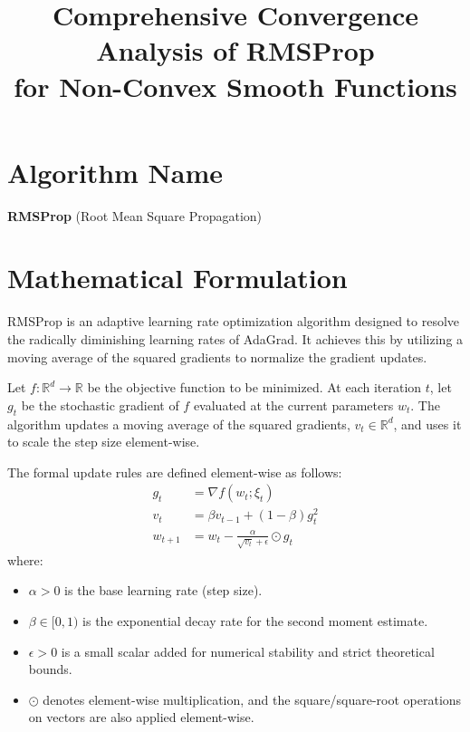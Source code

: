 \documentclass[11pt]{article}
\title{Comprehensive Convergence Analysis of RMSProp \\ for Non-Convex Smooth Functions}
\author{}
\date{}
\begin{document}
\maketitle

\section*{Algorithm Name}
\textbf{RMSProp} (Root Mean Square Propagation)

\section*{Mathematical Formulation}
RMSProp is an adaptive learning rate optimization algorithm designed to resolve the radically diminishing learning rates of AdaGrad. It achieves this by utilizing a moving average of the squared gradients to normalize the gradient updates. 

Let $f: \mathbb{R}^d \rightarrow \mathbb{R}$ be the objective function to be minimized. At each iteration $t$, let $g_t$ be the stochastic gradient of $f$ evaluated at the current parameters $w_t$. The algorithm updates a moving average of the squared gradients, $v_t \in \mathbb{R}^d$, and uses it to scale the step size element-wise.

The formal update rules are defined element-wise as follows:
\begin{align*}
    g_t &= \nabla f(w_t; \xi_t) \\
    v_t &= \beta v_{t-1} + (1 - \beta) g_t^2 \\
    w_{t+1} &= w_t - \frac{\alpha}{\sqrt{v_t} + \epsilon} \odot g_t
\end{align*}
where:
\begin{itemize}
    \item $\alpha > 0$ is the base learning rate (step size).
    \item $\beta \in [0, 1)$ is the exponential decay rate for the second moment estimate.
    \item $\epsilon > 0$ is a small scalar added for numerical stability and strict theoretical bounds.
    \item $\odot$ denotes element-wise multiplication, and the square/square-root operations on vectors are also applied element-wise.
\end{itemize}
\end{document}
